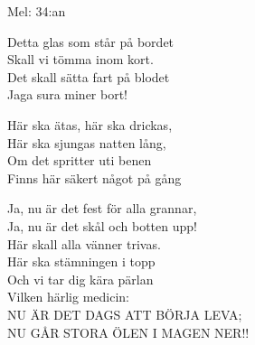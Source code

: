 \begin{SongText}
    \begin{SongInfo}
        Mel: 34:an
    \end{SongInfo}
    \begin{SongVerse}
        Detta glas som står på bordet\\%
        Skall vi tömma inom kort.\\%
        Det skall sätta fart på blodet\\%
        Jaga sura miner bort!
    \end{SongVerse}
    \begin{SongVerse}
        Här ska ätas, här ska drickas,\\%
        Här ska sjungas natten lång,\\%
        Om det spritter uti benen\\%
        Finns här säkert något på gång
    \end{SongVerse}
    \begin{SongVerse}
        Ja, nu är det fest för alla grannar,\\%
        Ja, nu är det skål och botten upp!\\%
        Här skall alla vänner trivas.\\%
        Här ska stämningen i topp\\%
        Och vi tar dig kära pärlan\\%
        Vilken härlig medicin:\\%
        NU ÄR DET DAGS ATT BÖRJA LEVA;\\%
        NU GÅR STORA ÖLEN I MAGEN NER!!
    \end{SongVerse}
\end{SongText}
